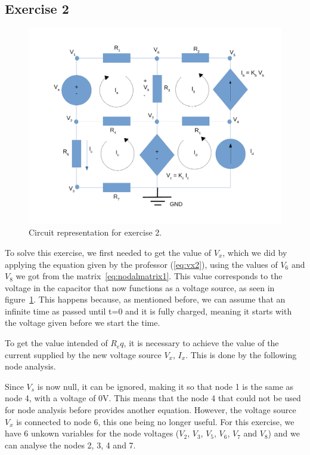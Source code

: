 \subsection{Exercise 2}
\label{sec:exercise2}

\label{sec:Exercise 2}
\begin{figure}[!ht] \centering
\includegraphics[width=0.8\linewidth]{circuit_mesh.pdf}
\caption{Circuit representation for exercise 2.}
\label{fig:nodeanalysis2}
\end{figure}

To solve this exercise, we first needed to get the value of $V_x$, which we did by applying the equation given by the professor (\ref{eq:vx2}), using the values of $V_6$ and $V_8$ we got from the matrix~\ref{eq:nodalmatrix1}. This value corresponds to the voltage in the capacitor that now functions as a voltage source, as seen in figure~\ref{fig:nodeanalysis2}. This happens because, as mentioned before, we can assume that an infinite time as passed until t=0 and it is fully charged, meaning it starts with the voltage given before we start the time.

To get the value intended of $R_eq$, it is necessary to achieve the value of the current supplied by the new voltage source $V_x$, $I_x$. This is done by the following node analysis.

Since $V_s$ is now null, it can be ignored, making it so that node 1 is the same as node 4, with a voltage of 0V. This means that the node 4 that could not be used for node analysis before provides another equation. However, the voltage source $V_x$ is connected to node 6, this one being no longer useful. For this exercise, we have 6 unkown variables for the node voltages ($V_2$, $V_3$, $V_5$, $V_6$, $V_7$ and $V_8$) and we can analyse the nodes 2, 3, 4 and 7.

